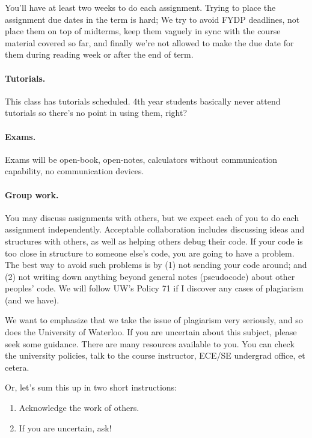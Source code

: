 \documentclass[letterpaper,10pt]{article}
\begin{document}
You'll have at least two weeks to do each assignment. Trying to place the assignment due dates in the term is hard; We try to avoid FYDP deadlines, not place them on top of midterms, keep them vaguely in sync with the course material covered so far, and finally we're not allowed to make the due date for them during reading week or after the end of term. 

\paragraph{Tutorials.} This class has tutorials scheduled. 4th year students basically never attend tutorials so there's no point in using them, right?

\paragraph{Exams.} Exams will be open-book, open-notes, calculators without communication capability, no communication devices.

\paragraph{Group work.} 
You may discuss assignments with others, but we expect each of you to
do each assignment independently. Acceptable collaboration includes
discussing ideas and structures with others, as well as helping others
debug their code. If your code is too close in structure to someone
else's code, you are going to have a problem. The best way to avoid
such problems is by (1) not sending your code around; and (2) not
writing down anything beyond general notes (pseudocode) about other
peoples' code. We will follow UW's Policy 71 if I discover any cases of
plagiarism (and we have). 

We want to emphasize that we take the issue of plagiarism very seriously, and so does the University of Waterloo. If you are uncertain about this subject, please seek some guidance. There are many resources available to you. You can check the university policies, talk to the course instructor, ECE/SE undergrad office, et cetera.

Or, let's sum this up in two short instructions:
\begin{enumerate}
	\item Acknowledge the work of others. 
	\item If you are uncertain, ask!
\end{enumerate}
\end{document}
